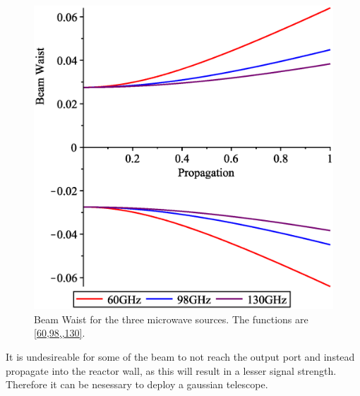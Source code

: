 \begin{figure}[H]
	\centering
	\includegraphics[width=.5\textwidth]{Figures/BeamProp.eps}
	\caption{Beam Waist for the three microwave sources. The functions are \cref{60,98,,130}.}
	\label{BeamProp}
\end{figure}
It is undesireable for some of the beam to not reach the output port and instead propagate into the reactor wall, as this will result in a lesser signal strength. Therefore it can be nesessary to deploy a gaussian telescope.
